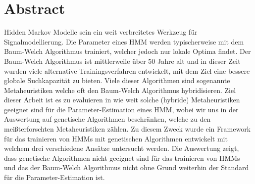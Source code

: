 \chapter*{Abstract}
Hidden Markov Modelle sein ein weit verbreitetes Werkzeug für Signalmodellierung. Die Parameter eines HMM werden typischerweise mit dem Baum-Welch Algorithmus trainiert, welcher jedoch nur lokale Optima findet. Der Baum-Welch Algorithmus ist mittlerweile über 50 Jahre alt und in dieser Zeit wurden viele alternative Trainingsverfahren entwickelt, mit dem Ziel eine bessere globale Suchkapazität zu bieten. Viele dieser Algorithmen sind sogenannte Metaheuristiken welche oft den Baum-Welch Algorithmus hybridisieren. Ziel dieser Arbeit ist es zu evaluieren in wie weit solche (hybride) Metaheuristiken geeignet sind für die Parameter-Estimation eines HMM, wobei wir uns in der Auswertung auf genetische Algorithmen beschränken, welche zu den meißterforschten Metaheuristiken zählen. Zu diesem Zweck wurde ein Framework für das trainieren von HMMs mit genetischen Algorithmen entwickelt mit welchem drei verschiedene Ansätze untersucht werden. Die Auswertung zeigt, dass genetische Algorithmen nicht geeignet sind für das trainieren von HMMs und das der Baum-Welch Algorithmus nicht ohne Grund weiterhin der Standard für die Parameter-Estimation ist.